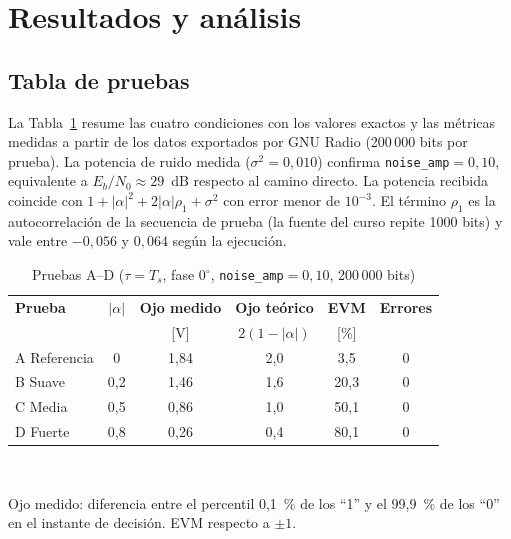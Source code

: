 \section{Resultados y análisis}

\subsection{Tabla de pruebas}
La Tabla~\ref{tab:pruebas} resume las cuatro condiciones con los valores exactos y las métricas medidas a partir de los datos exportados por GNU Radio (200\,000 bits por prueba). La potencia de ruido medida ($\sigma^2=0{,}010$) confirma \texttt{noise\_amp}$=0{,}10$, equivalente a $E_b/N_0\approx29$~dB respecto al camino directo. La potencia recibida coincide con $1+|\alpha|^2+2|\alpha|\rho_1+\sigma^2$ con error menor de $10^{-3}$. El término $\rho_1$ es la autocorrelación de la secuencia de prueba (la fuente del curso repite 1000 bits) y vale entre $-0{,}056$ y $0{,}064$ según la ejecución.

\begin{table}[!t]
\centering
\caption{Pruebas A--D ($\tau=T_s$, fase $0^\circ$, \texttt{noise\_amp}$=0{,}10$, 200\,000 bits)}
\label{tab:pruebas}
\footnotesize
\setlength{\tabcolsep}{3pt}
\begin{tabular}{lccccc}
\toprule
\textbf{Prueba} & $|\alpha|$ & \textbf{Ojo medido} & \textbf{Ojo teórico} & \textbf{EVM} & \textbf{Errores} \\
 & & [V] & $2(1-|\alpha|)$ & [\%] & \\
\midrule
A Referencia & 0   & 1,84 & 2,0 & 3,5  & 0 \\
B Suave      & 0,2 & 1,46 & 1,6 & 20,3 & 0 \\
C Media      & 0,5 & 0,86 & 1,0 & 50,1 & 0 \\
D Fuerte     & 0,8 & 0,26 & 0,4 & 80,1 & 0 \\
\bottomrule
\end{tabular}
\\[2pt]\raggedright\scriptsize Ojo medido: diferencia entre el percentil 0,1~\% de los ``1'' y el 99,9~\% de los ``0'' en el instante de decisión. EVM respecto a $\pm1$.
\end{table}

